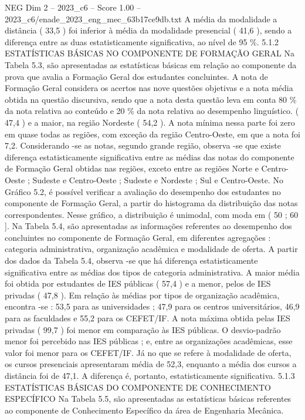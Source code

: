 \begin{textsample}{NEG Dim 2 – 2023\_c6 – Score 1.00 – 2023\_c6/enade\_2023\_eng\_mec\_63b17ce9db.txt}
A média da modalidade a distância ( 33,5 ) foi inferior à média da modalidade presencial ( 41,6 ), sendo a diferença entre as duas estatisticamente significativa, ao nível de 95 \%. 5.1.2 ESTATÍSTICAS BÁSICAS NO COMPONENTE DE FORMAÇÃO GERAL Na Tabela 5.3, são apresentadas as estatísticas básicas em relação ao componente da prova que avalia a Formação Geral dos estudantes concluintes.
A nota de Formação Geral considera os acertos nas nove questões objetivas e a nota média obtida na questão discursiva, sendo que a nota desta questão leva em conta 80 \% da nota relativa ao conteúdo e 20 \% da nota relativa ao desempenho linguístico. ( 47,4 ) e a maior, na região Nordeste ( 54,2 ).
A nota mínima nessa parte foi zero em quase todas as regiões, com exceção da região Centro-Oeste, em que a nota foi 7,2.
Considerando -se as notas, segundo grande região, observa -se que existe diferença estatisticamente significativa entre as médias das notas do componente de Formação Geral obtidas nas regiões, exceto entre as regiões Norte e Centro-Oeste ; Sudeste e Centro-Oeste ; Sudeste e Nordeste ; Sul e Centro-Oeste.
No Gráfico 5.2, é possível verificar a avaliação do desempenho dos estudantes no componente de Formação Geral, a partir do histograma da distribuição das notas correspondentes.
Nesse gráfico, a distribuição é unimodal, com moda em ( 50 ; 60 ].
Na Tabela 5.4, são apresentadas as informações referentes ao desempenho dos concluintes no componente de Formação Geral, em diferentes agregações : categoria administrativa, organização acadêmica e modalidade de oferta.
A partir dos dados da Tabela 5.4, observa -se que há diferença estatisticamente significativa entre as médias dos tipos de categoria administrativa.
A maior média foi obtida por estudantes de IES públicas ( 57,4 ) e a menor, pelos de IES privadas ( 47,8 ).
Em relação às médias por tipos de organização acadêmica, encontra -se : 53,5 para as universidades ; 47,9 para os centros universitários, 46,9 para as faculdades e 55,2 para os CEFET/IF.
A nota máxima obtida pelas IES privadas ( 99,7 ) foi menor em comparação às IES públicas.
O desvio-padrão menor foi percebido nas IES públicas ; e, entre as organizações acadêmicas, esse valor foi menor para os CEFET/IF.
Já no que se refere à modalidade de oferta, os cursos presenciais apresentaram média de 52,3, enquanto a média dos cursos a distância foi de 47,1.
A diferença é, portanto, estatisticamente significativa. 5.1.3 ESTATÍSTICAS BÁSICAS DO COMPONENTE DE CONHECIMENTO ESPECÍFICO Na Tabela 5.5, são apresentadas as estatísticas básicas referentes ao componente de Conhecimento Específico da área de Engenharia Mecânica.

\end{textsample}
